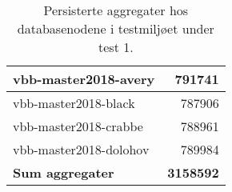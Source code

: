 \begin{table}[hbtp]
  \caption{Persisterte aggregater hos databasenodene i testmiljøet under test 1.}
  \begin{center}
    \begin{tabular}{ | l | r |}
      \hline
      vbb-master2018-avery & 791741 \\ \hline
      vbb-master2018-black & 787906 \\ \hline
      vbb-master2018-crabbe & 788961 \\ \hline
      vbb-master2018-dolohov & 789984 \\ \hline
      \textbf{Sum aggregater} & \textbf{3158592} \\ \hline
    \end{tabular}
  \end{center}
  \label{backend1}
\end{table}
